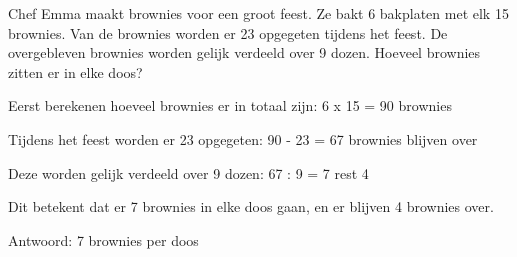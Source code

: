 \begin{opgave}
Chef Emma maakt brownies voor een groot feest. Ze bakt 6 bakplaten met elk 
15 brownies. Van de brownies worden er 23 opgegeten tijdens het feest. De 
overgebleven brownies worden gelijk verdeeld over 9 dozen. Hoeveel brownies 
zitten er in elke doos?
\end{opgave}

\begin{oplossing}
Eerst berekenen hoeveel brownies er in totaal zijn:
6 x 15 = 90 brownies

Tijdens het feest worden er 23 opgegeten:
90 - 23 = 67 brownies blijven over

Deze worden gelijk verdeeld over 9 dozen:
67 : 9 = 7 rest 4

Dit betekent dat er 7 brownies in elke doos gaan, en er blijven 4 brownies 
over.

Antwoord: 7 brownies per doos
\end{oplossing}